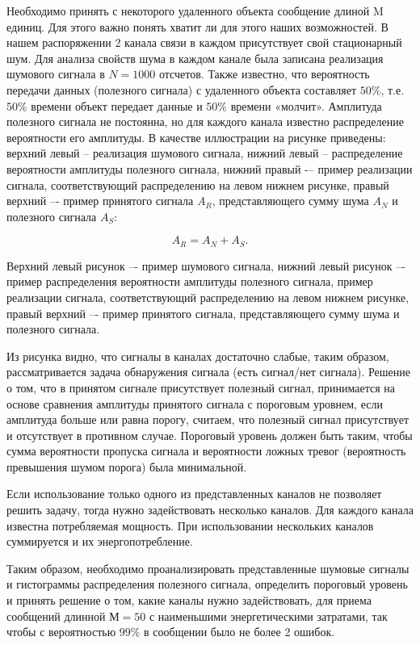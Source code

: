 
Необходимо принять с некоторого удаленного объекта сообщение длиной M единиц. Для этого важно понять хватит ли для этого наших возможностей. В нашем распоряжении 2 канала связи в каждом присутствует свой стационарный шум. Для анализа свойств шума в каждом канале была записана реализация шумового сигнала в $N = 1000$ отсчетов. Также известно, что вероятность передачи данных (полезного сигнала) с удаленного объекта составляет $50\%$, т.е. $50\%$ времени объект передает данные и $50\%$ времени «молчит». Амплитуда полезного сигнала не постоянна, но для каждого канала известно распределение вероятности его амплитуды. В качестве иллюстрации на рисунке приведены: верхний левый -- реализация шумового сигнала, нижний левый -- распределение вероятности амплитуды полезного сигнала, нижний правый -– пример реализации сигнала, соответствующий распределению на левом нижнем рисунке, правый верхний –- пример принятого сигнала $A_R$, представляющего сумму шума $A_N$ и полезного сигнала $A_S$:

$$A_R = A_N + A_S.$$


Верхний левый рисунок –- пример шумового сигнала, нижний левый рисунок –- пример распределения вероятности амплитуды полезного сигнала, пример реализации сигнала, соответствующий распределению на левом нижнем рисунке, правый верхний –- пример принятого сигнала, представляющего сумму шума и полезного сигнала.

Из рисунка видно, что сигналы в каналах достаточно слабые, таким образом, рассматривается задача обнаружения сигнала (есть сигнал/нет сигнала). Решение о том, что в принятом сигнале присутствует полезный сигнал, принимается на основе сравнения амплитуды принятого сигнала с пороговым уровнем, если амплитуда больше или равна порогу, считаем, что полезный сигнал присутствует и отсутствует в противном случае. Пороговый уровень должен быть таким, чтобы сумма вероятности пропуска сигнала и вероятности ложных тревог (вероятность превышения шумом порога) была минимальной.

Если использование только одного из представленных каналов не позволяет решить задачу, тогда нужно задействовать несколько каналов. Для каждого канала известна потребляемая мощность. При использовании нескольких каналов суммируется и их энергопотребление.

Таким образом, необходимо проанализировать представленные шумовые сигналы и гистограммы распределения полезного сигнала, определить пороговый уровень и принять решение о том, какие каналы нужно задействовать, для приема сообщений длинной $М=50$ с наименьшими энергетическими затратами, так чтобы с вероятностью $99\%$ в сообщении было не более 2 ошибок.

